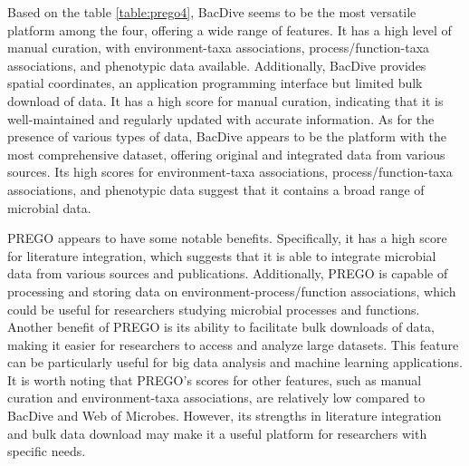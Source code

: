 Based on the table \ref{table:prego4}, BacDive seems to be the most versatile
platform among the four, offering a wide range of features. It has a high level
of manual curation, with environment-taxa associations, process/function-taxa
associations, and phenotypic data available. Additionally, BacDive provides
spatial coordinates, an application programming interface but limited bulk download of data.
It has a high score for manual curation, indicating that it is well-maintained and regularly updated with accurate information.
As for the presence of various types of data, BacDive appears to be the platform
with the most comprehensive dataset, offering original and integrated data from
various sources. Its high scores for environment-taxa associations,
process/function-taxa associations, and phenotypic data suggest that it contains a broad range of microbial data.

PREGO appears to have some notable benefits. Specifically, it has a high score
for literature integration, which suggests that it is able to integrate microbial
data from various sources and publications. Additionally, PREGO is capable of
processing and storing data on environment-process/function associations, which
could be useful for researchers studying microbial processes and functions.
Another benefit of PREGO is its ability to facilitate bulk downloads of data,
making it easier for researchers to access and analyze large datasets.
This feature can be particularly useful for big data analysis and machine learning applications.
It is worth noting that PREGO's scores for other features, such as manual
curation and environment-taxa associations, are relatively low compared to
BacDive and Web of Microbes. However, its strengths in literature integration
and bulk data download may make it a useful platform for researchers with specific needs.


